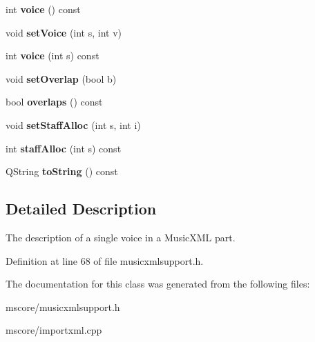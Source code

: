 \begin{DoxyCompactItemize}
\item 
\mbox{\label{class_ms_1_1_voice_desc_ae8cef2b9e33d43583d880cebb8ad98ef}} 
int {\bfseries voice} () const
\item 
\mbox{\label{class_ms_1_1_voice_desc_a348abc3cb1cd9199c4727af7b252fe2f}} 
void {\bfseries set\+Voice} (int s, int v)
\item 
\mbox{\label{class_ms_1_1_voice_desc_abe3be6dbf2abacc074b8a36d2c7d12bc}} 
int {\bfseries voice} (int s) const
\item 
\mbox{\label{class_ms_1_1_voice_desc_a1da9f1d3f424eac6b1cb9dd99b65608f}} 
void {\bfseries set\+Overlap} (bool b)
\item 
\mbox{\label{class_ms_1_1_voice_desc_a2fea512a18e5494d6085e7b9d0e7b702}} 
bool {\bfseries overlaps} () const
\item 
\mbox{\label{class_ms_1_1_voice_desc_ad8fb62710a1eb836a1b0c88aa1733434}} 
void {\bfseries set\+Staff\+Alloc} (int s, int i)
\item 
\mbox{\label{class_ms_1_1_voice_desc_ad0a87575c052faf2387dd8dd6c65f642}} 
int {\bfseries staff\+Alloc} (int s) const
\item 
\mbox{\label{class_ms_1_1_voice_desc_aba50123d72d471d6af74d36a1eecb107}} 
Q\+String {\bfseries to\+String} () const
\end{DoxyCompactItemize}


\subsection{Detailed Description}
The description of a single voice in a Music\+X\+ML part. 

Definition at line 68 of file musicxmlsupport.\+h.



The documentation for this class was generated from the following files\+:\begin{DoxyCompactItemize}
\item 
mscore/musicxmlsupport.\+h\item 
mscore/importxml.\+cpp\end{DoxyCompactItemize}
